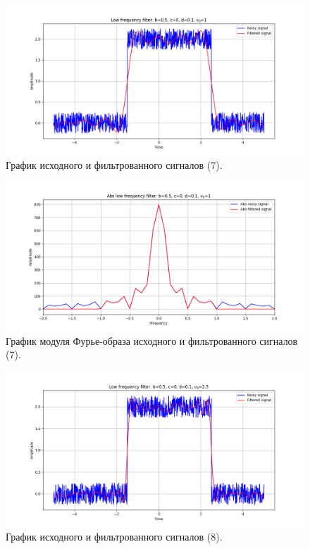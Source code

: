 \documentclass[a4paper, 12pt]{article}
\begin{document}
    \begin{figure}[!htb]
        \centering
        \includegraphics[scale=0.48]{12_u_flt_u_nohigh.png}
        \captionsetup{skip=0pt}
        \caption{График исходного и фильтрованного сигналов (7).}
        \label{fig:fig13}
    \end{figure}
    \begin{figure}[!htb]
        \centering
        \includegraphics[scale=0.48]{12_abs_u_U_nohigh.png}
        \captionsetup{skip=0pt}
        \caption{График модуля Фурье-образа исходного и фильтрованного сигналов (7).}
        \label{fig:fig14}
    \end{figure}
    \begin{figure}[!htb]
        \centering
        \includegraphics[scale=0.48]{13_u_flt_u_nohigh.png}
        \captionsetup{skip=0pt}
        \caption{График исходного и фильтрованного сигналов (8).}
        \label{fig:fig15}
    \end{figure}
\end{document}
